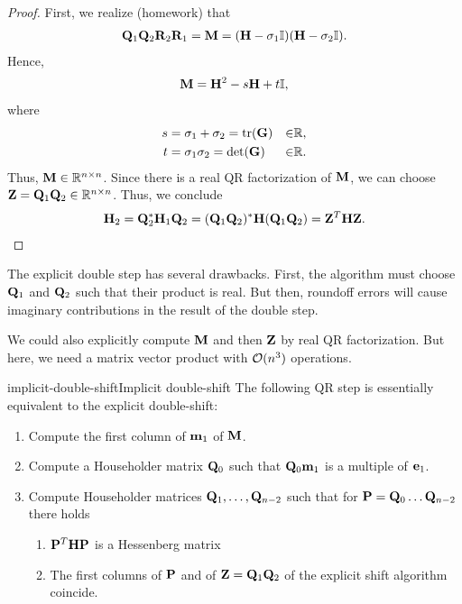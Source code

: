 \begin{proof}
  First, we realize (homework) that
  \begin{gather}
    \mathbf Q_1\mathbf Q_2\mathbf R_2\mathbf R_1 = \mathbf M = (\mathbf H-\sigma_1\mathbb I)(\mathbf H-\sigma_2\mathbb I).
  \end{gather}
  Hence,
  \begin{gather}
    \mathbf M = \mathbf H^2-s\mathbf H+t\mathbb I,
  \end{gather}
  where
  \begin{gather}
    \begin{aligned}
      s &= \sigma_1+\sigma_2 = \operatorname{tr}(\mathbf G)&\in&\mathbb R,\\
      t &= \sigma_1\sigma_2 = \det(\mathbf G)&\in&\mathbb R.
    \end{aligned}
  \end{gather}
  Thus, $\mathbf M\in\mathbb R^{n\times n}$. Since there is a real QR factorization of
  $\mathbf M$, we can choose $\mathbf Z = \mathbf Q_1\mathbf Q_2\in\mathbb R^{n\times n}$. Thus, we
  conclude
  \begin{gather}
    \mathbf H_2 = \mathbf Q_2^*\mathbf H_1\mathbf Q_2 = (\mathbf Q_1\mathbf Q_2)^*\mathbf H(\mathbf Q_1\mathbf Q_2) = \mathbf Z^T\mathbf H\mathbf Z.
  \end{gather}
\end{proof}

\begin{remark}
  The explicit double step has several drawbacks. First, the algorithm
  must choose $\mathbf Q_1$ and $\mathbf Q_2$ such that their product is
  real. But then, roundoff errors will cause imaginary contributions
  in the result of the double step.

  We could also explicitly compute $\mathbf M$ and then $\mathbf Z$ by real QR
  factorization. But here, we need a matrix vector product with
  $\mathcal O(n^3)$ operations.
\end{remark}

\begin{Theorem}{implicit-double-shift}{Implicit double-shift}
  The following QR step is essentially equivalent to the explicit double-shift:
  \begin{enumerate}
  \item Compute the first column of $\mathbf m_1$ of $\mathbf M$.
  \item Compute a Householder matrix $\mathbf Q_0$ such that $\mathbf Q_0\mathbf m_1$ is a multiple of $\mathbf e_1$.
  \item Compute Householder matrices $\mathbf Q_1,\dots,\mathbf Q_{n-2}$ such
    that for $\mathbf P = \mathbf Q_0\dots\mathbf Q_{n-2}$ there holds
    \begin{enumerate}
    \item $\mathbf P^T\mathbf H\mathbf P$ is a Hessenberg matrix
    \item The first columns of $\mathbf P$ and of $\mathbf Z = \mathbf Q_1\mathbf Q_2$
      of the explicit shift algorithm coincide.
    \end{enumerate}
  \end{enumerate}
\end{Theorem}


